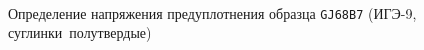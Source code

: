     \begin{figure}
        {\centering
            \small
            \hfill 
            \\
            \hfill   
            \hfill 
            }
            \caption{Определение напряжения предуплотнения образца \texttt{GJ68B7} (ИГЭ-9, суглинки полутвердые)}
            \label{img:68B7}
    \end{figure}